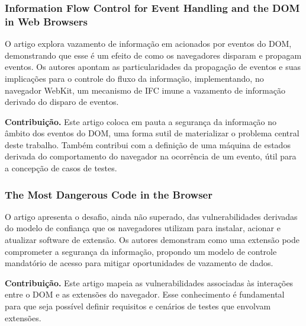 \subsubsection{Information Flow Control for Event Handling and the DOM in Web Browsers \cite{Rajani2015}}
O artigo explora vazamento de informação em {\scripts} acionados por eventos do DOM, demonstrando que esse é um efeito de como os navegadores disparam e propagam eventos. Os autores apontam as particularidades da propagação de eventos e suas implicações para o controle do fluxo da informação, implementando, no navegador WebKit, um mecanismo de IFC imune a vazamento de informação derivado do disparo de eventos.

\textbf{Contribuição.} Este artigo coloca em pauta a segurança da informação no âmbito dos eventos do DOM, uma forma sutil de materializar o problema central deste trabalho. Também contribui com a definição de uma máquina de estados derivada do comportamento do navegador na ocorrência de um evento, útil para a concepção de casos de testes.


\subsubsection{The Most Dangerous Code in the Browser \cite{Heule2015_Most_Dangerous_Code}}
O artigo apresenta o desafio, ainda não superado, das vulnerabilidades derivadas do modelo de confiança que os navegadores utilizam para instalar, acionar e atualizar software de extensão. Os autores demonstram como uma extensão pode comprometer a segurança da informação, propondo um modelo de controle mandatório de acesso para mitigar oportunidades de vazamento de dados.

\textbf{Contribuição.} Este artigo mapeia as vulnerabilidades associadas às interações entre o DOM e as extensões do navegador. Esse conhecimento é fundamental para que seja possível definir requisitos e cenários de testes que envolvam extensões.